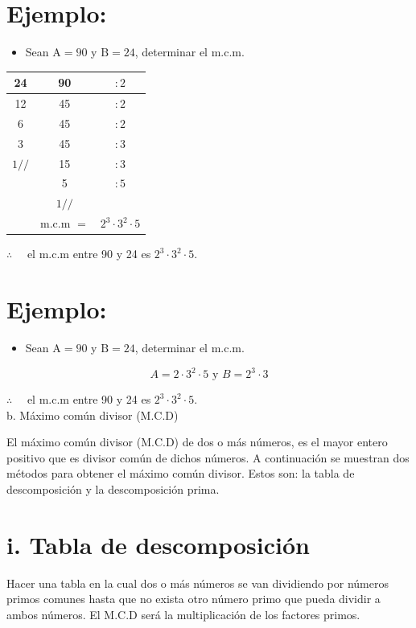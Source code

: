 \documentclass[10pt]{article}
\begin{document}
\section*{Ejemplo:}
\begin{itemize}
  \item Sean $\mathrm{A}=90$ y $\mathrm{B}=24$, determinar el m.c.m.
\end{itemize}

\begin{center}
\begin{tabular}{cc|c}
24 & 90 & $: 2$ \\
\hline
12 & 45 & $: 2$ \\
6 & 45 & $: 2$ \\
3 & 45 & $: 3$ \\
$1 / /$ & 15 & $: 3$ \\
 & 5 & $: 5$ \\
 & $1 / /$ &  \\
\hline
 & m.c.m $=$ & $2^{3} \cdot 3^{2} \cdot 5$ \\
\hline
\end{tabular}
\end{center}

$\therefore \quad$ el m.c.m entre 90 y 24 es $2^{3} \cdot 3^{2} \cdot 5$.

\section*{Ejemplo:}
\begin{itemize}
  \item Sean $\mathrm{A}=90$ y $\mathrm{B}=24$, determinar el m.c.m.
\end{itemize}

$$
A=2 \cdot 3^{2} \cdot 5 \text { y } B=2^{3} \cdot 3
$$

$\therefore \quad$ el m.c.m entre 90 y 24 es $2^{3} \cdot 3^{2} \cdot 5$.\\
b. Máximo común divisor (M.C.D)

El máximo común divisor (M.C.D) de dos o más números, es el mayor entero positivo que es divisor común de dichos números. A continuación se muestran dos métodos para obtener el máximo común divisor. Estos son: la tabla de descomposición y la descomposición prima.

\section*{i. Tabla de descomposición}
Hacer una tabla en la cual dos o más números se van dividiendo por números primos comunes hasta que no exista otro número primo que pueda dividir a ambos números. El M.C.D será la multiplicación de los factores primos.
\end{document}
